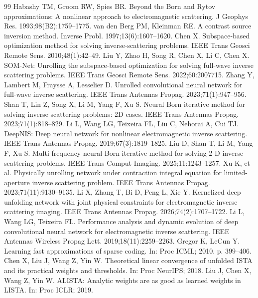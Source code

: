 \documentclass[journal,cmes,article,submit,moreauthors,pdftex]{Definitions/tsp}
\begin{document}
\begin{thebibliography}{99}
Habashy TM, Groom RW, Spies BR. Beyond the Born and Rytov approximations: A nonlinear approach to electromagnetic scattering. J Geophys Res. 1993;98(B2):1759--1775.
van den Berg PM, Kleinman RE. A contrast source inversion method. Inverse Probl. 1997;13(6):1607--1620.
Chen X. Subspace-based optimization method for solving inverse-scattering problems. IEEE Trans Geosci Remote Sens. 2010;48(1):42--49.
Liu Y, Zhao H, Song R, Chen X, Li C, Chen X. SOM-Net: Unrolling the subspace-based optimization for solving full-wave inverse scattering problems. IEEE Trans Geosci Remote Sens. 2022;60:2007715.
Zhang Y, Lambert M, Fraysse A, Lesselier D. Unrolled convolutional neural network for full-wave inverse scattering. IEEE Trans Antennas Propag. 2023;71(1):947--956.
Shan T, Lin Z, Song X, Li M, Yang F, Xu S. Neural Born iterative method for solving inverse scattering problems: 2D cases. IEEE Trans Antennas Propag. 2023;71(1):818--829.
Li L, Wang LG, Teixeira FL, Liu C, Nehorai A, Cui TJ. DeepNIS: Deep neural network for nonlinear electromagnetic inverse scattering. IEEE Trans Antennas Propag. 2019;67(3):1819--1825.
Liu D, Shan T, Li M, Yang F, Xu S. Multi-frequency neural Born iterative method for solving 2-D inverse scattering problems. IEEE Trans Comput Imaging. 2025;11:1243--1257.
Xu K, et al. Physically unrolling network under contraction integral equation for limited-aperture inverse scattering problem. IEEE Trans Antennas Propag. 2023;71(11):9130--9135.
Li X, Zhang T, Bi D, Peng L, Xie Y. Kernelized deep unfolding network with joint physical constraints for electromagnetic inverse scattering imaging. IEEE Trans Antennas Propag. 2026;74(2):1707--1722.
Li L, Wang LG, Teixeira FL. Performance analysis and dynamic evolution of deep convolutional neural network for electromagnetic inverse scattering. IEEE Antennas Wireless Propag Lett. 2019;18(11):2259--2263.
Gregor K, LeCun Y. Learning fast approximations of sparse coding. In: Proc ICML; 2010. p. 399--406.
Chen X, Liu J, Wang Z, Yin W. Theoretical linear convergence of unfolded ISTA and its practical weights and thresholds. In: Proc NeurIPS; 2018.
Liu J, Chen X, Wang Z, Yin W. ALISTA: Analytic weights are as good as learned weights in LISTA. In: Proc ICLR; 2019.

\end{thebibliography}
\end{document}
